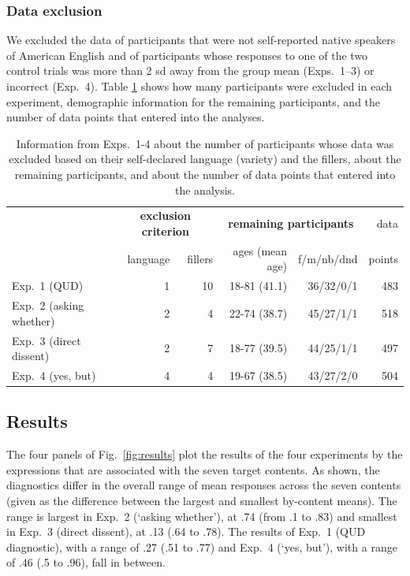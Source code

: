 \documentclass[times,linguex]{glossa}
\begin{document}
\subsubsection{Data exclusion}

We excluded the data of participants that were not self-reported native speakers of American English and of participants whose responses to one of the two control trials was more than 2 sd away from the group mean (Exps.~1--3) or incorrect (Exp.~4). Table \ref{t:excluded} shows how many participants were excluded in each experiment, demographic information for the remaining participants, and the number of data points that entered into the analyses.

\begin{table}[h!]
  \centering
  \begin{tabular}{l | r r | r r  | r }
    & \multicolumn{2}{c|}{\bf exclusion criterion} & \multicolumn{2}{c|}{\bf remaining participants} & data \\ 
    & language & fillers & ages (mean age) & f/m/nb/dnd           &  points \\ \hline
    Exp.~1 (QUD)   & 1 &  10 &  18-81 (41.1) & 36/32/0/1          & 483 \\ 
    Exp.~2 (asking whether) &  2 &  4 & 22-74 (38.7) & 45/27/1/1  & 518 \\ 
    Exp.~3 (direct dissent) &  2 &  7 & 18-77 (39.5) & 44/25/1/1  & 497 \\ 
    Exp.~4 (yes, but) & 4 & 4 & 19-67 (38.5)  & 43/27/2/0         & 504 \\ 
    \hline
  \end{tabular}
  \caption{Information from Exps.~1-4 about the number of participants whose data was excluded based on their self-declared language (variety) and the fillers, about the remaining participants, and about the number of data points that entered into the analysis.}\label{t:excluded}
\end{table}

\subsection{Results}
The four panels of Fig.~\ref{fig:results} plot the results of the four experiments by the expressions that are associated with the seven target contents. %
As shown, the diagnostics differ in the overall range of mean responses across the seven contents (given as the difference between the largest and smallest by-content means). The range is largest in Exp.~2 (`asking whether'), at .74 (from .1 to .83) and smallest in Exp.~3 (direct dissent), at .13 (.64 to .78). The results of Exp.~1 (QUD diagnostic), with a range of .27 (.51 to .77) and Exp.~4 (`yes, but'), with a range of .46 (.5 to .96), fall in between.
\end{document}
